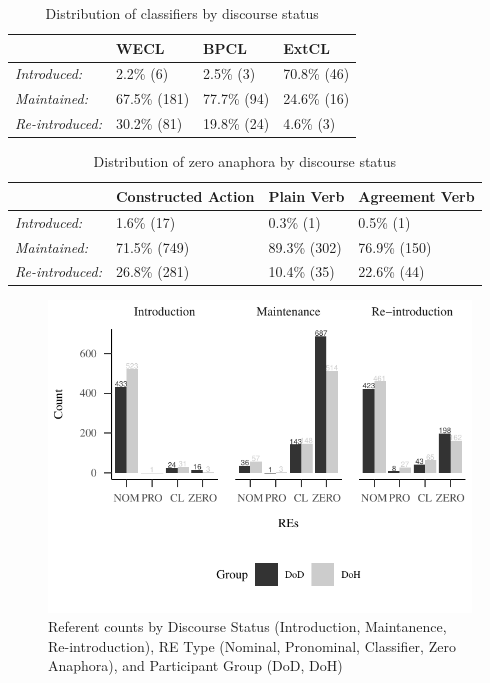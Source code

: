 \documentclass[]{elsarticle} %
\begin{document}
\begin{table}
\small
\caption{Distribution of classifiers by discourse status}
\label{tab:my-table4}
\begin{tabular}{llll}
\hline
                        & WECL          & BPCL        & ExtCL         \\ \hline
\textit{Introduced:}    & 2.2\% (6)    & 2.5\% (3)   & 70.8\% (46) \\
\textit{Maintained:}    & 67.5\% (181) & 77.7\% (94) & 24.6\% (16) \\
\textit{Re-introduced:} & 30.2\% (81)   & 19.8\% (24)   & 4.6\% (3)   \\ \hline
\end{tabular}
\end{table}

\begin{table}
\small
\caption{Distribution of zero anaphora by discourse status}
\label{tab:my-table5}
\begin{tabular}{llll}
\hline
                        & Constructed Action & Plain Verb    & Agreement Verb \\ \hline
\textit{Introduced:}    & 1.6\% (17)        & 0.3\% (1)    & 0.5\% (1)      \\
\textit{Maintained:}    & 71.5\% (749)      & 89.3\% (302) & 76.9\% (150)  \\
\textit{Re-introduced:} & 26.8\% (281)      & 10.4\% (35)   & 22.6\% (44)   \\ \hline
\end{tabular}
\end{table}

\begin{figure}
\centering
\includegraphics{revised_manuscript_files/figure-latex/fig-count-plot-1.pdf}
\caption{Referent counts by Discourse Status (Introduction, Maintanence,
Re-introduction), RE Type (Nominal, Pronominal, Classifier, Zero
Anaphora), and Participant Group (DoD, DoH)}
\end{figure}
\end{document}
